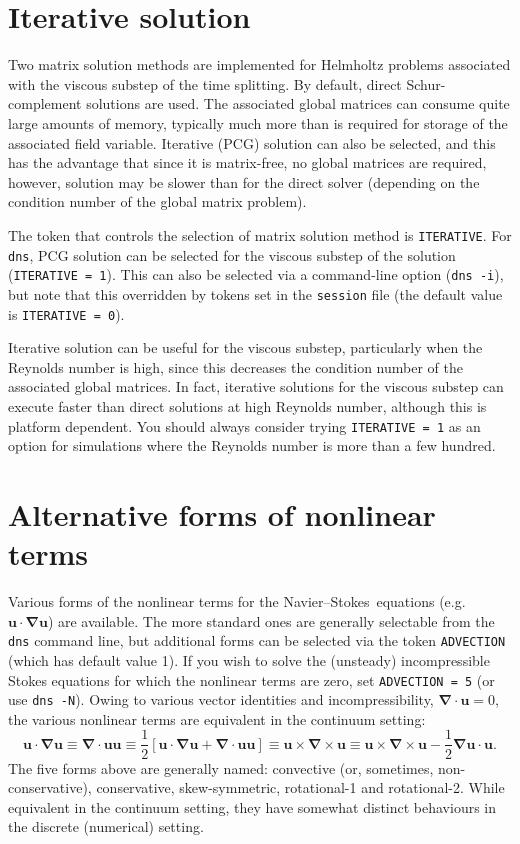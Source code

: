 \documentclass[11pt]{report}
\newcommand{\thalf}{{\textstyle\frac{1}{2}}}
\newcommand{\eg}{e.g.\ } \newcommand{\CC}{\mathrm{c.c.}}
\newcommand\NavSto{Navier--Stokes}
\begin{document}
\section{Iterative solution}
\label{sec.iterative}

Two matrix solution methods are implemented for Helmholtz problems
associated with the viscous substep of the time splitting.  By
default, direct Schur-complement solutions are used.  The associated
global matrices can consume quite large amounts of memory, typically
much more than is required for storage of the associated field
variable.  Iterative (PCG) solution can also be selected, and this has
the advantage that since it is matrix-free, no global matrices are
required, however, solution may be slower than for the direct solver
(depending on the condition number of the global matrix problem).

The token that controls the selection of matrix solution method is
\verb+ITERATIVE+.  For \verb+dns+, PCG solution can be selected for
the viscous substep of the solution (\verb+ITERATIVE = 1+).  This can
also be selected via a command-line option (\verb+dns -i+), but note
that this overridden by tokens set in the \verb+session+ file (the
default value is \verb+ITERATIVE = 0+).

Iterative solution can be useful for the viscous substep, particularly
when the Reynolds number is high, since this decreases the condition
number of the associated global matrices.  In fact, iterative
solutions for the viscous substep can execute faster than direct
solutions at high Reynolds number, although this is platform
dependent. You should always consider trying \verb+ITERATIVE = 1+ as
an option for simulations where the Reynolds number is more than a few
hundred.


\section{Alternative forms of nonlinear terms}
\label{sec.nonlinear}

Various forms of the nonlinear terms for the \NavSto\ equations (\eg
$\bm{u\cdot\nabla u}$) are available.  The more standard ones are
generally selectable from the \verb+dns+ command line, but additional
forms can be selected via the token \verb+ADVECTION+ (which has
default value 1).  If you wish to solve the (unsteady) incompressible
Stokes equations for which the nonlinear terms are zero, set
\verb+ADVECTION = 5+ (or use \verb+dns -N+).  Owing to various vector
identities and incompressibility, $\bm{\nabla\cdot u}=0$, the various
nonlinear terms are equivalent in the continuum setting:
\[
\bm{u\cdot\nabla u} \equiv
\bm{\nabla\cdot uu} \equiv
\thalf[\bm{u\cdot\nabla u}+\bm{\nabla\cdot uu}] \equiv
\bm{u}\times\bm{\nabla}\times\bm{u} \equiv
\bm{u}\times\bm{\nabla}\times\bm{u} - \thalf\bm{\nabla u\cdot u}.
\]
The five forms above are generally named: convective (or, sometimes,
non-conservative), conservative, skew-symmetric, rotational-1 and
rotational-2.  While equivalent in the continuum setting, they have
somewhat distinct behaviours in the discrete (numerical) setting.
\end{document}
